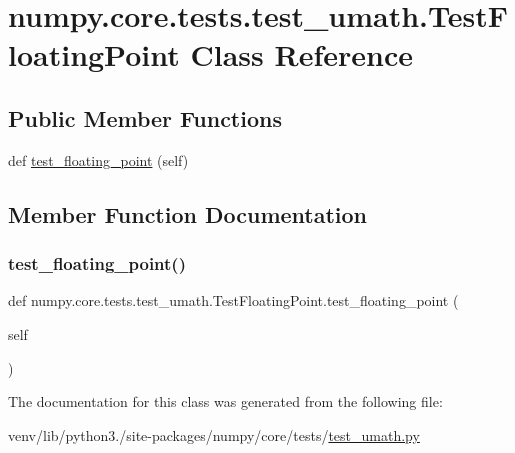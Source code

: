\hypertarget{classnumpy_1_1core_1_1tests_1_1test__umath_1_1TestFloatingPoint}{}\section{numpy.\+core.\+tests.\+test\+\_\+umath.\+Test\+Floating\+Point Class Reference}
\label{classnumpy_1_1core_1_1tests_1_1test__umath_1_1TestFloatingPoint}
\subsection*{Public Member Functions}
\begin{DoxyCompactItemize}
\item 
def \hyperlink{classnumpy_1_1core_1_1tests_1_1test__umath_1_1TestFloatingPoint_a67777cb9aeb7f34cb72de882fc9f09f6}{test\+\_\+floating\+\_\+point} (self)
\end{DoxyCompactItemize}


\subsection{Member Function Documentation}
\mbox{\label{classnumpy_1_1core_1_1tests_1_1test__umath_1_1TestFloatingPoint_a67777cb9aeb7f34cb72de882fc9f09f6}} 
\subsubsection{\texorpdfstring{test\+\_\+floating\+\_\+point()}{test\_floating\_point()}}
{\footnotesize\ttfamily def numpy.\+core.\+tests.\+test\+\_\+umath.\+Test\+Floating\+Point.\+test\+\_\+floating\+\_\+point (\begin{DoxyParamCaption}\item[{}]{self }\end{DoxyParamCaption})}



The documentation for this class was generated from the following file\+:\begin{DoxyCompactItemize}
\item 
venv/lib/python3./site-\/packages/numpy/core/tests/\hyperlink{test__umath_8py}{test\+\_\+umath.\+py}\end{DoxyCompactItemize}
